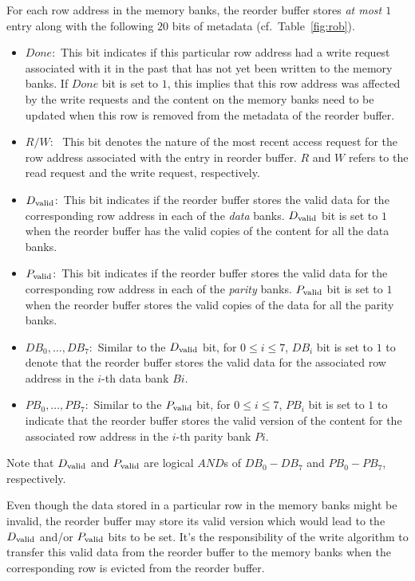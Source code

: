 For each row address in the memory banks, the reorder buffer stores {\em at most $1$} entry along with the following $20$ bits of metadata (cf.~Table~\ref{fig:rob}). 
\begin{itemize}
\item {$Done$:~}This bit indicates if this particular row address had a write request associated with it in the past that has not yet been written to the memory banks. If $Done$ bit is set to $1$, this implies that this row address was affected by the write requests and the content on the memory banks need to be updated when this row is removed from the metadata of the reorder buffer.
\item {$R/W$:~} This bit denotes the nature of the most recent access request for the row address associated with the entry in reorder buffer. $R$ and $W$ refers to the read request and the write request, respectively.
\item {$D_{\rm valid}$:~}This bit indicates if the reorder buffer stores the valid data for the corresponding row address in each of the {\em data} banks. $D_{\rm valid}$ bit is set to $1$ when the reorder buffer has the valid copies of the content for all the data banks.
\item {$P_{\rm valid}$:~}This bit indicates if the reorder buffer stores the valid data for the corresponding row address in each of the {\em parity} banks. $P_{\rm valid}$ bit is set to $1$ when the reorder buffer stores the valid copies of the data for all the parity banks.
\item {$DB_0, \ldots, DB_7$:~}Similar to the $D_{\rm valid}$ bit, for $0 \leq i \leq 7$, $DB_{i}$ bit is set to $1$ to denote that the reorder buffer stores the valid data for the associated row address in the $i$-th data bank $Bi$.
\item {$PB_0, \ldots, PB_7$:~}Similar to the $P_{\rm valid}$ bit, for $0 \leq i \leq 7$, $PB_{i}$ bit is set to $1$ to indicate that the reorder buffer stores the valid version of the content for the associated row address in the $i$-th parity bank $Pi$.
\end{itemize}
Note that $D_{\rm valid}$ and $P_{\rm valid}$ are logical $AND$s  of $DB_{0}-DB_{7}$ and $PB_{0}-PB_{7}$, respectively. 
\begin{remark}
Even though the data stored in a particular row in the memory banks might be invalid, the reorder buffer may store its valid version which would lead to the $D_{\rm valid}$ and/or $P_{\rm valid}$ bits to be set. It's the responsibility of the write algorithm to transfer this valid data from the reorder buffer to the memory banks when the corresponding row is evicted from the reorder buffer.
\end{remark}

